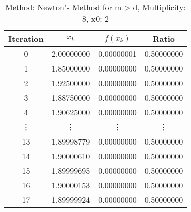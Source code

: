 \begin{table}
\centering
\caption{Method: Newton's Method for m > d, Multiplicity: 8, x0: 2}
\label{tab:table_Newton's_Method_for_m_>_d_8_2}
\begin{tabular}{c c c c}
\toprule
Iteration &      $x_k$ &   $f(x_k)$ &      Ratio \\
\midrule
        0 & 2.00000000 & 0.00000001 & 0.50000000 \\
        1 & 1.85000000 & 0.00000000 & 0.50000000 \\
        2 & 1.92500000 & 0.00000000 & 0.50000000 \\
        3 & 1.88750000 & 0.00000000 & 0.50000000 \\
        4 & 1.90625000 & 0.00000000 & 0.50000000 \\
   \vdots &     \vdots &     \vdots &     \vdots \\
       13 & 1.89998779 & 0.00000000 & 0.50000000 \\
       14 & 1.90000610 & 0.00000000 & 0.50000000 \\
       15 & 1.89999695 & 0.00000000 & 0.50000000 \\
       16 & 1.90000153 & 0.00000000 & 0.50000000 \\
       17 & 1.89999924 & 0.00000000 & 0.50000000 \\
\bottomrule
\end{tabular}
\end{table}
